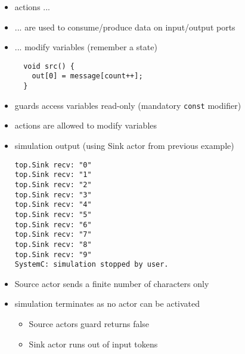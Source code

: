 \begin{frame}[fragile=singleslide]
\begin{itemize}
\item actions ...
\item ... are used to consume/produce data on input/output ports
\item ... modify variables (remember a state)
\begin{lstlisting}
  void src() {
    out[0] = message[count++];
  }
\end{lstlisting}
\item guards access variables read-only (mandatory \lstinline!const! modifier)
\item actions are allowed to modify variables
\end{itemize}
\end{frame}










\begin{frame}[fragile=singleslide]
\begin{itemize}
\item simulation output (using Sink actor from previous example)
\begin{lstlisting}
top.Sink recv: "0"
top.Sink recv: "1"
top.Sink recv: "2"
top.Sink recv: "3"
top.Sink recv: "4"
top.Sink recv: "5"
top.Sink recv: "6"
top.Sink recv: "7"
top.Sink recv: "8"
top.Sink recv: "9"
SystemC: simulation stopped by user.
\end{lstlisting}
\item Source actor sends a finite number of characters only
\item simulation terminates as no actor can be activated
  \begin{itemize}
  \item Source actors guard returns false
  \item Sink actor runs out of input tokens
  \end{itemize}
\end{itemize}
\end{frame}





